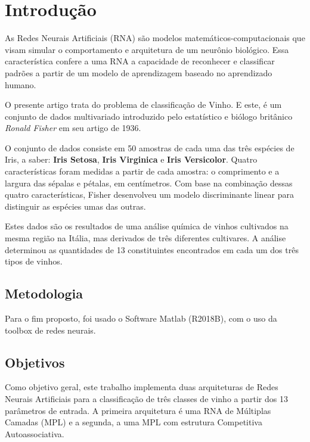 
\section{Introdução}

As Redes Neurais Artificiais (RNA) são modelos matemáticos-computacionais que visam simular o comportamento e arquitetura de um neurônio biológico. Essa característica confere a uma RNA a capacidade de reconhecer e classificar padrões a partir de um modelo de aprendizagem baseado no aprendizado humano.

O presente artigo trata do problema de classificação de Vinho. E este, é um conjunto de dados multivariado introduzido pelo estatístico e biólogo britânico \textit{Ronald Fisher} em seu artigo de 1936.

O conjunto de dados consiste em 50 amostras de cada uma das três espécies de Iris, a saber: \textbf{Iris Setosa}, \textbf{Iris Virginica} e \textbf{Iris Versicolor}. Quatro características foram medidas a partir de cada amostra: o comprimento e a largura das sépalas e pétalas, em centímetros. Com base na combinação dessas quatro características, Fisher desenvolveu um modelo discriminante linear para distinguir as espécies umas das outras.

Estes dados são os resultados de uma análise química de vinhos cultivados na mesma região na Itália, mas derivados de três diferentes cultivares. A análise determinou as quantidades de 13 constituintes encontrados em cada um dos três tipos de vinhos.

\subsection{Metodologia}

Para o fim proposto, foi usado o Software Matlab (R2018B), com o uso da toolbox de redes neurais.


\subsection{Objetivos}

Como objetivo geral, este trabalho implementa duas arquiteturas de Redes Neurais Artificiais para a classificação de três classes de vinho a partir dos 13 parâmetros de entrada. A primeira arquitetura é uma RNA de Múltiplas Camadas (MPL) e a segunda, a uma MPL com estrutura Competitiva Autoassociativa.

